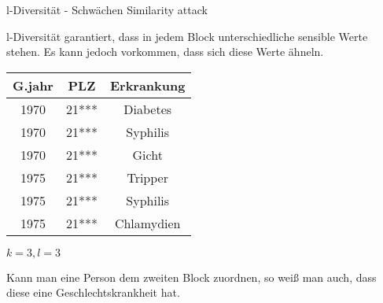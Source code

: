 \begin{frame}{l-Diversität - Schwächen}
	\large \textcolor{gray!80}{Similarity attack} \normalsize \small\cite{Li2007t-closseness} 
	\vspace{0.2cm}

	l-Diversität garantiert, dass in jedem Block unterschiedliche sensible Werte stehen. Es kann jedoch vorkommen, dass sich diese Werte ähneln.

	\vspace{0.5cm}
	\centering
	\begin{tabular}{|c|c|c|}
	\hline \textbf{G.jahr} & \textbf{PLZ} & \textbf{Erkrankung} \\
	\hline
     1970 & 21*** & Diabetes \\ 
	 1970 & 21*** & Syphilis \\ 
	 1970 & 21*** & Gicht \\
	\hline 
     1975 & 21*** & \cellcolor{svsrot}Tripper \\
     1975 & 21*** & \cellcolor{svsrot}Syphilis \\ 
	 1975 & 21*** & \cellcolor{svsrot}Chlamydien \\ 
	\hline 
	\end{tabular}

	\vspace{0.2cm}
	\(k = 3, l = 3\)
	\vspace{0.5cm}

	Kann man eine Person dem zweiten Block zuordnen, so weiß man auch, dass diese eine Geschlechtskrankheit hat.
\end{frame}
